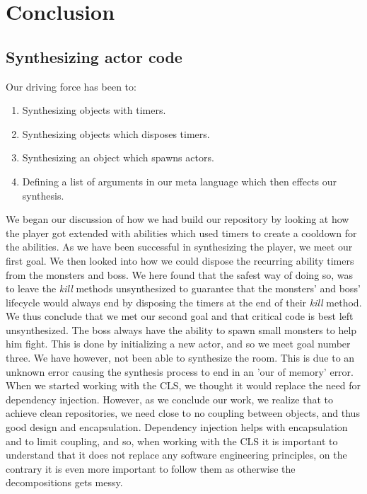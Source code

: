 \section{Conclusion}
\subsection{Synthesizing actor code}
Our driving force has been to:
\begin{enumerate}
	\item Synthesizing objects with timers.
	\item Synthesizing objects which disposes timers.
	\item Synthesizing an object which spawns actors.
	\item Defining a list of arguments in our meta language which then effects our synthesis. 
\end{enumerate}
We began our discussion of how we had build our repository by looking at how the player got extended with abilities which used timers to create a cooldown for the abilities. As we have been successful in synthesizing the player, we meet our first goal. We then looked into how we could dispose the recurring ability timers from the monsters and boss. We here found that the safest way of doing so, was to leave the \textit{kill} methods unsynthesized to guarantee that the monsters' and boss' lifecycle would always end by disposing the timers at the end of their \textit{kill} method. We thus conclude that we met our second goal and that critical code is best left unsynthesized. The boss always have the ability to spawn small monsters to help him fight. This is done by initializing a new actor, and so we meet goal number three. We have however, not been able to synthesize the room. This is due to an unknown error causing the synthesis process to end in an 'our of memory' error.\\
When we started working with the CLS, we thought it would replace the need for dependency injection. However, as we conclude our work, we realize that to achieve clean repositories, we need close to no coupling between objects, and thus good design and encapsulation. Dependency injection helps with encapsulation and to limit coupling, and so, when working with the CLS it is important to understand that it does not replace any software engineering principles, on the contrary it is even more important to follow them as otherwise the decompositions gets messy.\\
